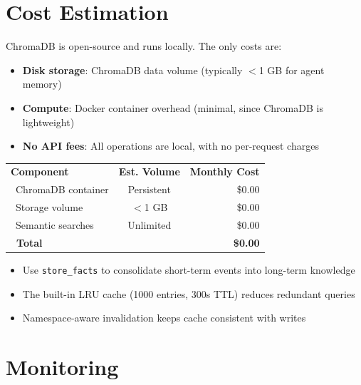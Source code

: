 \documentclass[11pt,letterpaper]{article}
\renewcommand{\arraystretch}{1.4}
\newcommand{\faDatabase}{\ding{115}}
\newcommand{\faSearch}{\ding{70}}
\newcommand{\faCalculator}{\ding{70}}
\newcommand{\faDocker}{\ding{70}}
\newcommand{\api}[1]{\texttt{\textcolor{cloudblue}{#1}}}
\begin{document}
\section{Cost Estimation}

\begin{infobox}
ChromaDB is open-source and runs locally. The only costs are:
\begin{itemize}
  \item \textbf{Disk storage}: ChromaDB data volume (typically $<$1 GB for agent memory)
  \item \textbf{Compute}: Docker container overhead (minimal, since ChromaDB is lightweight)
  \item \textbf{No API fees}: All operations are local, with no per-request charges
\end{itemize}
\end{infobox}

\begin{center}
\renewcommand{\arraystretch}{1.4}
\begin{tabular}{L{4cm} c r}
\textbf{\color{white}Component} & \textbf{\color{white}Est. Volume} & \textbf{\color{white}Monthly Cost} \\
\faDocker\ ChromaDB container & Persistent & \$0.00 \\
\faDatabase\ Storage volume & $<$1 GB & \$0.00 \\
\faSearch\ Semantic searches & Unlimited & \$0.00 \\
\midrule
{}
\textbf{\faCalculator\ Total} & & \textbf{\textcolor{successgreen}{\$0.00}} \\
\bottomrule
\end{tabular}
\end{center}

\begin{tipbox}
\begin{itemize}
  \item Use \api{store\_facts} to consolidate short-term events into long-term knowledge
  \item The built-in LRU cache (1000 entries, 300s TTL) reduces redundant queries
  \item Namespace-aware invalidation keeps cache consistent with writes
\end{itemize}
\end{tipbox}

\section{Monitoring}
\end{document}
